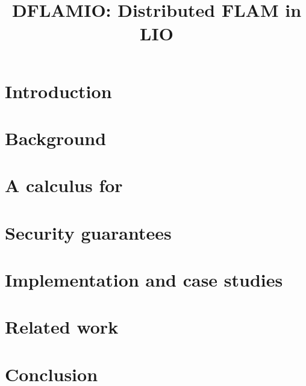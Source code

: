 \documentclass[conference]{IEEEtran}
\begin{document}
\title{DFLAMIO: Distributed FLAM in LIO}

\author{
}

\maketitle




\section{Introduction}\label{sec:introduction}


\section{Background}\label{sec:background}



\section{A calculus for \lang}\label{sec:calculus}



\section{Security guarantees}\label{sec:guarantees}



\section{Implementation and case studies}

\label{sec:case-studies}

\section{Related work}

\label{sec:related-work}

\section{Conclusion}

\label{sec:conclusion}




\vspace{12pt}

\appendix

\end{document}
